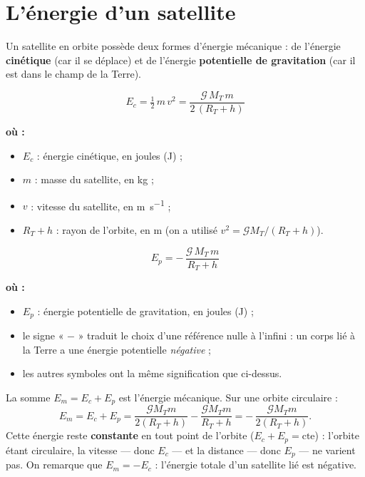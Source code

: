 \documentclass[11pt,a4paper]{article}
\newenvironment{ou}{%
  \par\smallskip\noindent\textbf{où :}\nopagebreak
  \begin{itemize}[leftmargin=1.8em,topsep=2pt,itemsep=1.5pt,parsep=0pt]}%
  {\end{itemize}}
\newcommand{\Grav}{\mathcal{G}}        %
\begin{document}
\section{L'énergie d'un satellite}

Un satellite en orbite possède deux formes d'énergie mécanique : de l'énergie
\textbf{cinétique} (car il se déplace) et de l'énergie \textbf{potentielle de gravitation}
(car il est dans le champ de la Terre).

\begin{formule}
\[
\boxed{\;E_c=\tfrac12\,m\,v^2=\dfrac{\Grav\,M_T\,m}{2\,(R_T+h)}\;}
\]
\begin{ou}
  \item $E_c$ : énergie cinétique, en joules (\si{\joule}) ;
  \item $m$ : masse du satellite, en \si{\kilogram} ;
  \item $v$ : vitesse du satellite, en \si{\metre\per\second} ;
  \item $R_T+h$ : rayon de l'orbite, en \si{\metre}
        (on a utilisé $v^2=\Grav M_T/(R_T+h)$).
\end{ou}
\end{formule}

\begin{formule}
\[
\boxed{\;E_p=-\,\dfrac{\Grav\,M_T\,m}{R_T+h}\;}
\]
\begin{ou}
  \item $E_p$ : énergie potentielle de gravitation, en joules (\si{\joule}) ;
  \item le signe « $-$ » traduit le choix d'une référence nulle à l'infini : un corps
        lié à la Terre a une énergie potentielle \emph{négative} ;
  \item les autres symboles ont la même signification que ci-dessus.
\end{ou}
\end{formule}

\begin{theoreme}
La somme $E_m=E_c+E_p$ est l'énergie mécanique. Sur une orbite circulaire :
\[
E_m=E_c+E_p=\frac{\Grav M_T m}{2(R_T+h)}-\frac{\Grav M_T m}{R_T+h}
   =-\,\frac{\Grav M_T m}{2(R_T+h)} .
\]
Cette énergie reste \textbf{constante} en tout point de l'orbite ($E_c+E_p=\text{cte}$) :
l'orbite étant circulaire, la vitesse — donc $E_c$ — et la distance — donc $E_p$ — ne
varient pas. On remarque que $E_m=-E_c$ : l'énergie totale d'un satellite lié est
négative.
\end{theoreme}
\end{document}
